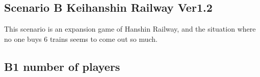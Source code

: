 \documentclass{article}
\begin{document}
\begin{CJK}{UTF8}{min}


















\section*{Scenario B Keihanshin Railway Ver1.2}

This scenario is an expansion game of Hanshin Railway, and the
situation where no one buys 6 trains seems to come out so much.

\subsection*{B1 number of players}


\end{CJK}
\end{document}

